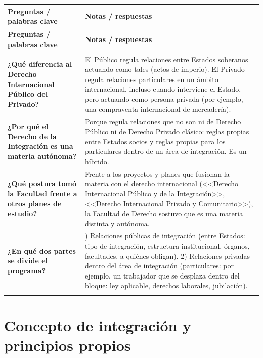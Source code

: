 \documentclass[12pt,oneside]{book}
\newlength{\cornizq}
\newlength{\cornder}
\newlength{\cornancho}
\newenvironment{cornell}
{%
    \small
    \renewcommand{\arraystretch}{1.3}%
    \begin{longtable}{>{\raggedright\arraybackslash}p{\cornizq}!{\vrule width 0.4pt}>{\raggedright\arraybackslash}p{\cornder}}
    \toprule
    \textbf{Preguntas / palabras clave} & \textbf{Notas / respuestas} \\
    \midrule
    \endfirsthead
    \toprule
    \textbf{Preguntas / palabras clave} & \textbf{Notas / respuestas} \\
    \midrule
    \endhead
    \midrule
    \multicolumn{2}{r}{\footnotesize\itshape continúa en la página siguiente} \\
    \endfoot
    \bottomrule
    \endlastfoot
}
{%
    \end{longtable}%
}
\begin{document}
\begin{cornell}
\textbf{¿Qué diferencia al Derecho Internacional Público del Privado?} &
El Público regula relaciones entre Estados soberanos actuando como tales (actos de imperio). El Privado regula relaciones particulares en un ámbito internacional, incluso cuando interviene el Estado, pero actuando como persona privada (por ejemplo, una compraventa internacional de mercadería). \\
\textbf{¿Por qué el Derecho de la Integración es una materia autónoma?} &
Porque regula relaciones que no son ni de Derecho Público ni de Derecho Privado clásico: reglas propias entre Estados socios y reglas propias para los particulares dentro de un área de integración. Es un híbrido. \\
\textbf{¿Qué postura tomó la Facultad frente a otros planes de estudio?} &
Frente a los proyectos y planes que fusionan la materia con el derecho internacional (<<Derecho Internacional Público y de la Integración>>, <<Derecho Internacional Privado y Comunitario>>), la Facultad de Derecho sostuvo que es una materia distinta y autónoma. \\
\textbf{¿En qué dos partes se divide el programa?} &
1) Relaciones públicas de integración (entre Estados: tipo de integración, estructura institucional, órganos, facultades, a quiénes obligan). 2) Relaciones privadas dentro del área de integración (particulares: por ejemplo, un trabajador que se desplaza dentro del bloque: ley aplicable, derechos laborales, jubilación). \\
\midrule
{} \\
\end{cornell}

\chapter{Concepto de integración y principios propios}
\end{document}

